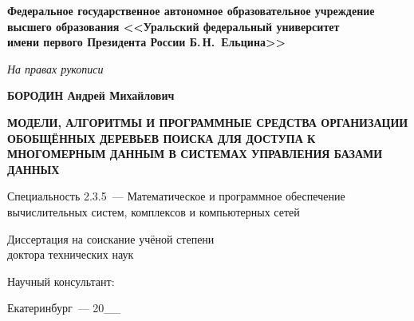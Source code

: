 \begin{titlepage}
\centering

\textbf{Федеральное государственное автономное образовательное учреждение\\
высшего образования <<Уральский федеральный университет\\
имени первого Президента России Б.\,Н.~Ельцина>>}

\vfill

\textit{На правах рукописи}

\vspace{2cm}

{\large\textbf{БОРОДИН Андрей Михайлович}}

\vspace{1.5cm}

{\large\textbf{МОДЕЛИ, АЛГОРИТМЫ И ПРОГРАММНЫЕ СРЕДСТВА ОРГАНИЗАЦИИ ОБОБЩЁННЫХ
ДЕРЕВЬЕВ ПОИСКА ДЛЯ ДОСТУПА К МНОГОМЕРНЫМ ДАННЫМ В СИСТЕМАХ УПРАВЛЕНИЯ БАЗАМИ
ДАННЫХ}}

\vspace{1.5cm}

Специальность 2.3.5~--- Математическое и программное обеспечение\\
вычислительных систем, комплексов и компьютерных сетей

\vspace{1.5cm}

Диссертация на соискание учёной степени\\
доктора технических наук

\vfill

\raggedleft
Научный консультант:\\
\vspace{2cm}

\centering
Екатеринбург~--- 20\_\_

\end{titlepage}
